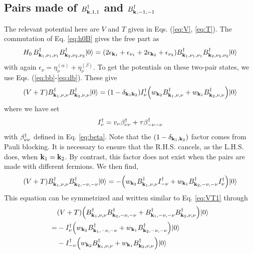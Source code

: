 \documentclass[11pt]{article} %
\begin{document}
\subsection{Pairs made of $B^{\dagger}_{\mathbf{k}^{ },1,1}$ and $B^{\dagger}_{\mathbf{k}^{ },-1,-1}$}
The relevant potential here are $V$ and $T$ given in Eqs. (\ref{eq:V}, \ref{eq:T}). The commutation of Eq.  \ref{eq:h0B} gives the free part as 
\begin{equation}\label{eq:H0B}
H_0\,B^{\dagger}_{\mathbf{k}_{1},\nu_1,\nu_1}B^{\dagger}_{\mathbf{k}_{2},\nu_2,\nu_2}|0\rangle=
(2\epsilon_{\mathbf{k}_1}+\epsilon_{\nu_1}+2\epsilon_{\mathbf{k}_2}+\epsilon_{\nu_2})B^{\dagger}_{\mathbf{k}_{1},\nu_1,\nu_1}B^{\dagger}_{\mathbf{k}_{2},\nu_2,\nu_2}|0\rangle
\end{equation}
with again $\epsilon_{\nu}=\eta_{\nu}^{(\alpha)}+\eta_{\nu}^{(\beta)}$. To get the potentials on these two-pair states, we use Eqs. (\ref{eq:bb}-\ref{eq:db}).  These give
\begin{equation}\label{eq:VT1}
(V+T)B^{\dagger}_{\mathbf{k}_{1},\nu,\nu}B^{\dagger}_{\mathbf{k}_{2},\nu,\nu}|0\rangle=(1-\delta_{\mathbf{k}_1\mathbf{k}_2})I^{\dagger}_{\nu}\Big(w_{\mathbf{k}_2}B^{\dagger}_{\mathbf{k}_{1},\nu,\nu}+w_{\mathbf{k}_1}B^{\dagger}_{\mathbf{k}_{2},\nu,\nu}\Big)|0\rangle
\end{equation}
where we have set
\begin{equation}
I^{\dagger}_{\nu}=v_{\nu}\beta^{\dagger}_{\nu\nu}+\tau{}\beta^{\dagger}_{-\nu-\nu}
\end{equation}
with $\beta^{\dagger}_{\nu\nu}$ defined in Eq. \ref{eq:beta}. Note that the $(1-\delta_{\mathbf{k}_1,\mathbf{k}_2})$ factor comes from Pauli blocking.  It is necessary to ensure that the R.H.S. cancels, as the L.H.S. does, when $\mathbf{k}_1=\mathbf{k}_2$.  By contrast, this factor does not exist when the pairs are made with different fermions.  We then find,
\begin{equation}
(V+T)B^{\dagger}_{\mathbf{k}_{1},\nu,\nu}B^{\dagger}_{\mathbf{k}_{2},-\nu,-\nu}|0\rangle
=-\Big(w_{\mathbf{k}_2}B^{\dagger}_{\mathbf{k}_{1},\nu,\nu}I^{\dagger}_{-\nu}+w_{\mathbf{k}_1}B^{\dagger}_{\mathbf{k}_{2},-\nu,-\nu}I^{\dagger}_{\nu}\Big)|0\rangle
\end{equation}
This equation can be symmetrized and written similar to Eq. \ref{eq:VT1} through
\begin{equation}
\begin{split}
&(V+T)\Big(B^{\dagger}_{\mathbf{k}_{1},\nu,\nu}B^{\dagger}_{\mathbf{k}_{2},-\nu,-\nu}+B^{\dagger}_{\mathbf{k}_{1},-\nu,-\nu}B^{\dagger}_{\mathbf{k}_{2},\nu,\nu}\Big)|0\rangle\\
=&-I^{\dagger}_{\nu}\Big(w_{\mathbf{k}_2}B^{\dagger}_{\mathbf{k}_{1},-\nu,-\nu}+w_{\mathbf{k}_1}B^{\dagger}_{\mathbf{k}_{2},-\nu,-\nu}\Big)|0\rangle\\
&-I^{\dagger}_{-\nu}\Big(w_{\mathbf{k}_2}B^{\dagger}_{\mathbf{k}_{1},\nu,\nu}+w_{\mathbf{k}_1}B^{\dagger}_{\mathbf{k}_{2},\nu,\nu}\Big)|0\rangle
\end{split}
\end{equation}
\end{document}
